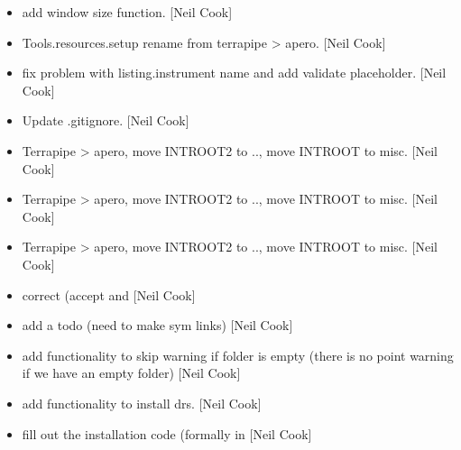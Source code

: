\documentclass[a4paper,10pt,english]{report}
\begin{document}
\begin{itemize}
\item {} 
 \sphinxhyphen{} add window size function. {[}Neil
Cook{]}

\item {} 
Tools.resources.setup \sphinxhyphen{} rename from terrapipe \textendash{}\textgreater{} apero. {[}Neil Cook{]}

\item {} 
 \sphinxhyphen{} fix problem with
listing.instrument name and add validate placeholder. {[}Neil Cook{]}

\item {} 
Update .gitignore. {[}Neil Cook{]}

\item {} 
Terrapipe \textendash{}\textgreater{} apero, move INTROOT2 to .., move INTROOT to misc. {[}Neil
Cook{]}

\item {} 
Terrapipe \textendash{}\textgreater{} apero, move INTROOT2 to .., move INTROOT to misc. {[}Neil
Cook{]}

\item {} 
Terrapipe \textendash{}\textgreater{} apero, move INTROOT2 to .., move INTROOT to misc. {[}Neil
Cook{]}

\item {} 
 \sphinxhyphen{} correct 
(accept  and  {[}Neil Cook{]}

\item {} 
 \sphinxhyphen{} add a todo (need to make sym links) {[}Neil Cook{]}

\item {} 
 \sphinxhyphen{} add functionality to skip warning if
folder is empty (there is no point warning if we have an empty folder)
{[}Neil Cook{]}

\item {} 
 \sphinxhyphen{} add functionality to install
drs. {[}Neil Cook{]}

\item {} 
 \sphinxhyphen{} fill out the installation code (formally in
 {[}Neil Cook{]}


\end{itemize}
\end{document}
